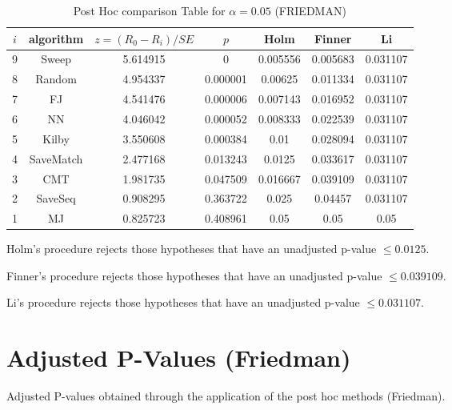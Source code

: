 \documentclass[a4paper,10pt]{article}
\begin{document}
\begin{landscape}
\begin{table}[!htp]
\centering\footnotesize
\begin{tabular}{ccccccc}
$i$&algorithm&$z=(R_0 - R_i)/SE$&$p$&Holm &Finner&Li\\
\hline9&Sweep&5.614915&0&0.005556&0.005683&0.031107\\8&Random&4.954337&0.000001&0.00625&0.011334&0.031107\\7&FJ&4.541476&0.000006&0.007143&0.016952&0.031107\\6&NN&4.046042&0.000052&0.008333&0.022539&0.031107\\5&Kilby&3.550608&0.000384&0.01&0.028094&0.031107\\4&SaveMatch&2.477168&0.013243&0.0125&0.033617&0.031107\\3&CMT&1.981735&0.047509&0.016667&0.039109&0.031107\\2&SaveSeq&0.908295&0.363722&0.025&0.04457&0.031107\\1&MJ&0.825723&0.408961&0.05&0.05&0.05\\\hline
\end{tabular}
\caption{Post Hoc comparison Table for $\alpha=0.05$ (FRIEDMAN)}
\end{table}Holm's procedure rejects those hypotheses that have an unadjusted p-value $\le0.0125$.

Finner's procedure rejects those hypotheses that have an unadjusted p-value $\le0.039109$.

Li's procedure rejects those hypotheses that have an unadjusted p-value $\le0.031107$.


\newpage

\section{Adjusted P-Values (Friedman)}


Adjusted P-values obtained through the application of the post hoc methods (Friedman).


\end{landscape}
\end{document}
